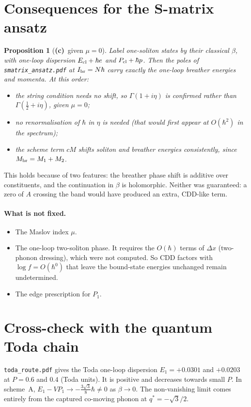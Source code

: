 \documentclass[11pt,a4paper]{article}
\newcommand{\Lc}{\textsf{\textbf{(c)}}}
\newtheorem{proposition}{Proposition}[section]
\theoremstyle{remark}\newtheorem{remark}[proposition]{Remark}
\begin{document}
\section{Consequences for the S-matrix ansatz}
\begin{proposition}[\Lc\ given $\mu=0$]
Label one-soliton states by their classical $\beta$, with one-loop dispersion $E_{\rm cl}+\hbar e$ and $P_{\rm cl}+\hbar p$. Then the poles of \texttt{smatrix\_ansatz.pdf} at $I_{\rm br}=N\hbar$ carry exactly the one-loop breather energies and momenta. At this order:
\begin{itemize}
\item the string condition needs no shift, so $\Gamma(1+i\eta)$ is confirmed rather than $\Gamma(\tfrac12+i\eta)$, given $\mu=0$;
\item no renormalisation of $\hbar$ in $\eta$ is needed (that would first appear at $O(\hbar^2)$ in the spectrum);
\item the scheme term $cM$ shifts soliton and breather energies consistently, since $M_{\rm br}=M_1+M_2$.
\end{itemize}
\end{proposition}
This holds because of two features: the breather phase shift is additive over constituents, and the continuation in $\beta$ is holomorphic. Neither was guaranteed: a zero of $A$ crossing the band would have produced an extra, CDD-like term.

\paragraph{What is not fixed.}
\begin{itemize}
\item The Maslov index $\mu$.
\item The one-loop two-soliton phase. It requires the $O(\hbar)$ terms of $\Delta x$ (two-phonon dressing), which were not computed. So CDD factors with $\log f=O(\hbar^0)$ that leave the bound-state energies unchanged remain undetermined.
\item The edge prescription for $P_1$.
\end{itemize}

\section{Cross-check with the quantum Toda chain}
\texttt{toda\_route.pdf} gives the Toda one-loop dispersion $E_1=+0.0301$ and $+0.0203$ at $P=0.6$ and $0.4$ (Toda units). It is positive and decreases towards small $P$. In scheme~A, $E_1-VP_1\to-\tfrac{3\sqrt3}8\hbar\neq0$ as $\beta\to0$. The non-vanishing limit comes entirely from the captured co-moving phonon at $q^*=-\sqrt3/2$.
\end{document}
